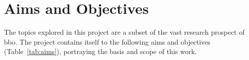 



\section{Aims and Objectives}
\label{sec:intro:aims}
The topics explored in this project are a subset of the vast research
prospect of \acrshort{bbo}. The project contains itself to the
following aims and objectives (Table~\ref{tab:aims}), portraying the
basis and scope of this work.

